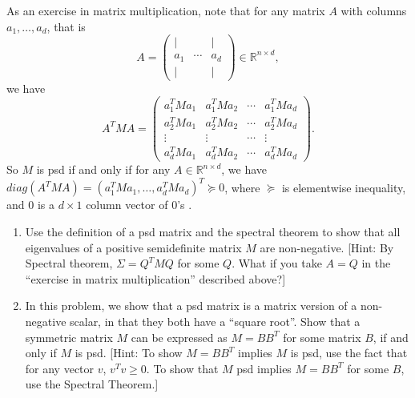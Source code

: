 \documentclass{article}
\theoremstyle{plain}
\theoremstyle{definition}
\begin{document}
As an exercise in matrix multiplication, note that for any matrix
$A$ with columns $a_{1},\ldots,a_{d}$, that is 
\[
A=\begin{pmatrix}| &  & |\\
a_{1} & \cdots & a_{d}\\
| &  & |
\end{pmatrix}\in\mathbb{R}^{n\times d},
\]
we have
\[
A^{T}MA=\begin{pmatrix}a_{1}^{T}Ma_{1} & a_{1}^{T}Ma_{2} & \cdots & a_{1}^{T}Ma_{d}\\
a_{2}^{T}Ma_{1} & a_{2}^{T}Ma_{2} & \cdots & a_{2}^{T}Ma_{d}\\
\vdots & \vdots & \cdots & \vdots\\
a_{d}^{T}Ma_{1} & a_{d}^{T}Ma_{2} & \cdots & a_{d}^{T}Ma_{d}
\end{pmatrix}.
\]
So $M$ is psd if and only if for any $A\in\mathbb{R}^{n\times d}$, we
have $diag(A^{T}MA)=\left(a_{1}^{T}Ma_{1},\ldots,a_{d}^{T}Ma_{d}\right)^{T}\succeq0$,
where $\succeq$ is elementwise inequality, and $0$ is a $d\times1$
column vector of $0$'s . 
\begin{enumerate}
\item Use the definition of a psd matrix and the spectral theorem to show
that all eigenvalues of a positive semidefinite matrix $M$ are non-negative.
{[}Hint: By Spectral theorem, $\Sigma=Q^{T}MQ$ for some $Q$. What
if you take $A=Q$ in the ``exercise in matrix multiplication''
described above?{]} \textbf{}\\
\item In this problem, we show that a psd matrix is a matrix version of
a non-negative scalar, in that they both have a ``square root''.
Show that a symmetric matrix $M$ can be expressed as $M=BB^{T}$
for some matrix $B$, if and only if $M$ is psd. {[}Hint: To show
$M=BB^{T}$ implies $M$ is psd, use the fact that for any vector
$v$, $v^{T}v\ge0$. To show that $M$ psd implies $M=BB^{T}$ for
some $B$, use the Spectral Theorem.{]}\\
\end{enumerate}
\end{document}
